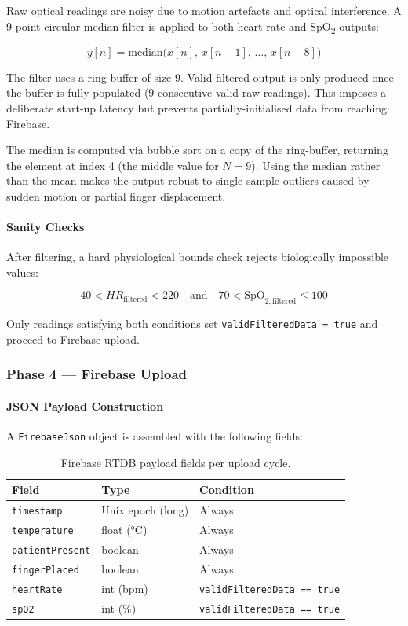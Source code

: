 \documentclass[12pt,a4paper]{report}
\begin{document}
Raw optical readings are noisy due to motion artefacts and optical interference. A
9-point circular median filter is applied to both heart rate and SpO\textsubscript{2}
outputs:

$$y[n] = \text{median}\bigl(x[n],\, x[n-1],\, \ldots,\, x[n-8]\bigr)$$

The filter uses a ring-buffer of size 9. Valid filtered output is only produced once the
buffer is fully populated (9 consecutive valid raw readings). This imposes a deliberate
start-up latency but prevents partially-initialised data from reaching Firebase.

The median is computed via bubble sort on a copy of the ring-buffer, returning the element
at index 4 (the middle value for $N=9$). Using the median rather than the mean makes the
output robust to single-sample outliers caused by sudden motion or partial finger
displacement.

\paragraph{Sanity Checks}

After filtering, a hard physiological bounds check rejects biologically impossible values:

$$40 < HR_{\text{filtered}} < 220 \quad \text{and} \quad 70 < \text{SpO}_{2,\text{filtered}} \leq 100$$

Only readings satisfying both conditions set \texttt{validFilteredData = true} and
proceed to Firebase upload.

\subsubsection{Phase 4 — Firebase Upload}

\paragraph{JSON Payload Construction}

A \texttt{FirebaseJson} object is assembled with the following fields:

\begin{table}[H]
\centering
\caption{Firebase RTDB payload fields per upload cycle.}
\begin{tabular}{@{}lll@{}}
\toprule
\textbf{Field} & \textbf{Type} & \textbf{Condition} \\
\midrule
\texttt{timestamp}      & Unix epoch (long) & Always \\
\texttt{temperature}    & float (°C)        & Always \\
\texttt{patientPresent} & boolean           & Always \\
\texttt{fingerPlaced}   & boolean           & Always \\
\texttt{heartRate}      & int (bpm)         & \texttt{validFilteredData == true} \\
\texttt{spO2}           & int (\%)          & \texttt{validFilteredData == true} \\
\bottomrule
\end{tabular}
\end{table}
\end{document}
